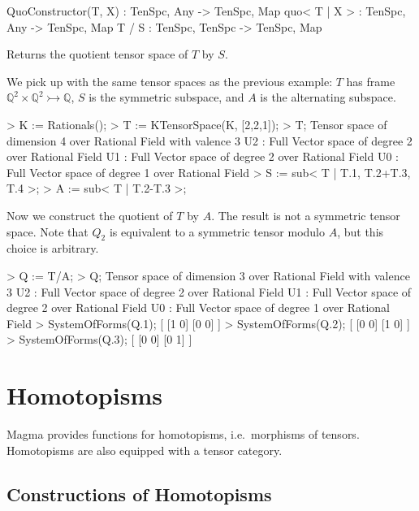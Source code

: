\begin{intrinsics}
QuoConstructor(T, X) : TenSpc, Any -> TenSpc, Map
quo< T | X > : TenSpc, Any -> TenSpc, Map
T / S : TenSpc, TenSpc -> TenSpc, Map
\end{intrinsics}

Returns the quotient tensor space of $T$ by $S$.

\begin{example}[QuotientTensorSpaces]

We pick up with the same tensor spaces as the previous example: $T$ has frame $\mathbb{Q}^2\times\mathbb{Q}^2\rightarrowtail \mathbb{Q}$, $S$ is the symmetric subspace, and $A$ is the alternating subspace.
\begin{code}
> K := Rationals();
> T := KTensorSpace(K, [2,2,1]);
> T;
Tensor space of dimension 4 over Rational Field with valence 3
U2 : Full Vector space of degree 2 over Rational Field
U1 : Full Vector space of degree 2 over Rational Field
U0 : Full Vector space of degree 1 over Rational Field
> S := sub< T | T.1, T.2+T.3, T.4 >;
> A := sub< T | T.2-T.3 >;
\end{code}

Now we construct the quotient of $T$ by $A$. 
The result is not a symmetric tensor space. 
Note that $Q_2$ is equivalent to a symmetric tensor modulo $A$, but this choice is arbitrary.
\begin{code}
> Q := T/A;
> Q;
Tensor space of dimension 3 over Rational Field with valence 3
U2 : Full Vector space of degree 2 over Rational Field
U1 : Full Vector space of degree 2 over Rational Field
U0 : Full Vector space of degree 1 over Rational Field
> SystemOfForms(Q.1);
[
    [1 0]
    [0 0]
]
> SystemOfForms(Q.2);
[
    [0 0]
    [1 0]
]
> SystemOfForms(Q.3);
[
    [0 0]
    [0 1]
]
\end{code}
\end{example}

\section{Homotopisms}

Magma provides functions for homotopisms, i.e.\ morphisms of tensors. Homotopisms are also equipped with a tensor category.

\subsection{Constructions of Homotopisms}~

